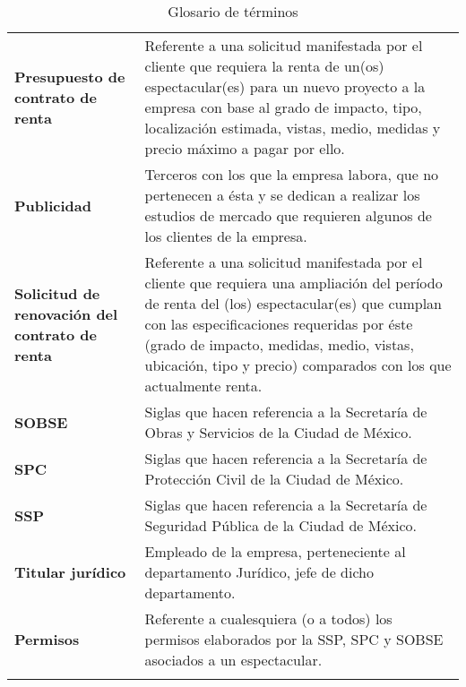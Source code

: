 \begin{longtable}[H]{m{4cm}m{8cm}}
\textbf{Presupuesto de contrato de renta} & Referente a una solicitud manifestada por el cliente que requiera la renta de un(os) espectacular(es) para un nuevo proyecto a la empresa con base al grado de impacto, tipo, localización estimada, vistas, medio, medidas y precio máximo a pagar por ello.\tabularnewline

\textbf{Publicidad} & Terceros con los que la empresa labora, que no pertenecen a ésta y se dedican a realizar los estudios de mercado que requieren algunos de los clientes de la empresa.\tabularnewline

\textbf{Solicitud de renovación del contrato de renta} & Referente a una solicitud manifestada por el cliente que requiera una ampliación del período de renta del (los) espectacular(es) que cumplan con las especificaciones requeridas por éste (grado de impacto, medidas, medio, vistas, ubicación, tipo y precio) comparados con los que actualmente renta.\tabularnewline

\textbf{SOBSE} & Siglas que hacen referencia a la Secretaría de Obras y Servicios de la Ciudad de México. \tabularnewline

\textbf{SPC} & Siglas que hacen referencia a la Secretaría de Protección Civil de la Ciudad de México. \tabularnewline

\textbf{SSP} & Siglas que hacen referencia a la Secretaría de Seguridad Pública de la Ciudad de México. \tabularnewline

\textbf{Titular jurídico} & Empleado de la empresa, perteneciente al departamento Jurídico, jefe de dicho departamento. \tabularnewline

\textbf{Permisos} & Referente a cualesquiera (o a todos) los permisos elaborados por la SSP, SPC y SOBSE asociados a un espectacular. \tabularnewline
\bottomrule

\caption{Glosario de términos}
\label{tbl:glosario}
\end{longtable}